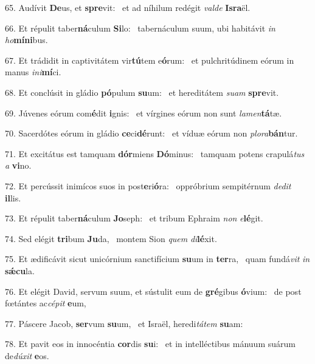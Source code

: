 65. Audívit \textbf{De}us, et \textbf{spre}vit: \ast\  et ad níhilum redégit \textit{val}\textit{de} \textbf{Is}\textbf{ra}ël.\

66. Et répulit taber\textbf{ná}culum \textbf{Si}lo: \ast\  tabernáculum suum, ubi habitávit \textit{in} \textit{ho}\textbf{mí}\textbf{ni}bus.\

67. Et trádidit in captivitátem vir\textbf{tú}tem e\textbf{ó}rum: \ast\  et pulchritúdinem eórum in manus \textit{in}\textit{i}\textbf{mí}ci.\

68. Et conclúsit in gládio \textbf{pó}pulum \textbf{su}um: \ast\  et hereditátem \textit{su}\textit{am} \textbf{spre}vit.\

69. Júvenes eórum com\textbf{é}dit \textbf{i}gnis: \ast\  et vírgines eórum non sunt \textit{la}\textit{men}\textbf{tá}tæ.\

70. Sacerdótes eórum in gládio \textbf{ce}ci\textbf{dé}runt: \ast\  et víduæ eórum non \textit{plo}\textit{ra}\textbf{bán}tur.\

71. Et excitátus est tamquam \textbf{dór}miens \textbf{Dó}minus: \ast\  tamquam potens crapulá\textit{tus} \textit{a} \textbf{vi}no.\

72. Et percússit inimícos suos in post\textbf{e}ri\textbf{ó}ra: \ast\  oppróbrium sempitérnum \textit{de}\textit{dit} \textbf{il}lis.\

73. Et répulit taber\textbf{ná}culum \textbf{Jo}seph: \ast\  et tribum Ephraim \textit{non} \textit{e}\textbf{lé}git.\

74. Sed elégit \textbf{tri}bum \textbf{Ju}da, \ast\  montem Sion \textit{quem} \textit{di}\textbf{lé}xit.\

75. Et ædificávit sicut unicórnium sanctifícium \textbf{su}um in \textbf{ter}ra, \ast\  quam fundá\textit{vit} \textit{in} \textbf{sǽ}\textbf{cu}la.\

76. Et elégit David, servum suum, et sústulit eum de \textbf{gré}gibus \textbf{ó}vium: \ast\  de post fœtántes ac\textit{cé}\textit{pit} \textbf{e}um,\

77. Páscere Jacob, \textbf{ser}vum \textbf{su}um, \ast\  et Israël, heredi\textit{tá}\textit{tem} \textbf{su}am:\

78. Et pavit eos in innocéntia \textbf{cor}dis \textbf{su}i: \ast\  et in intelléctibus mánuum suárum de\textit{dú}\textit{xit} \textbf{e}os.\

